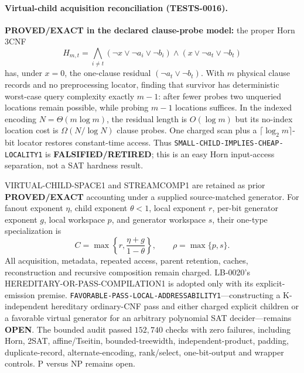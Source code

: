 \documentclass[11pt]{article}
\begin{document}
\paragraph{Virtual-child acquisition reconciliation (TESTS-0016).}
\textbf{PROVED/EXACT in the declared clause-probe model:} the proper Horn
3CNF
\[
 H_{m,t}=\bigwedge_{i\ne t}(\neg x\vee\neg a_i\vee\neg b_i)
 \wedge(x\vee\neg a_t\vee\neg b_t)
\]
has, under \(x=0\), the one-clause residual
\((\neg a_t\vee\neg b_t)\).  With \(m\) physical clause records and no
preprocessing locator, finding that survivor has deterministic worst-case
query complexity exactly \(m-1\): after fewer probes two unqueried locations
remain possible, while probing \(m-1\) locations suffices.  In the indexed
encoding \(N=\Theta(m\log m)\), the residual length is \(O(\log m)\) but its
no-index location cost is \(\Omega(N/\log N)\) clause probes.  One charged
scan plus a \(\lceil\log_2m\rceil\)-bit locator restores constant-time access.
Thus \texttt{SMALL-CHILD-IMPLIES-CHEAP-LOCALITY1} is
\textbf{FALSIFIED/RETIRED}; this is an easy Horn input-access separation, not
a SAT hardness result.

VIRTUAL-CHILD-SPACE1 and STREAMCOMP1 are retained as prior
\textbf{PROVED/EXACT} accounting under a supplied source-matched generator.
For fanout exponent \(\eta\), child exponent \(\theta<1\), local exponent
\(r\), per-bit generator exponent \(g\), local workspace \(p\), and generator
workspace \(s\), their one-type specialization is
\[
 C=\max\left\{r,\frac{\eta+g}{1-\theta}\right\},\qquad
 \rho=\max\{p,s\}.
\]
All acquisition, metadata, repeated access, parent retention, caches,
reconstruction and recursive composition remain charged.  LB-0020's
HEREDITARY-OR-PASS-COMPILATION1 is adopted only with its explicit-emission
premise.  \texttt{FAVORABLE-PASS-LOCAL-ADDRESSABILITY1}---constructing a
K-independent hereditary ordinary-CNF pass and either charged explicit
children or a favorable virtual generator for an arbitrary polynomial SAT
decider---remains \textbf{OPEN}.  The bounded audit passed \(152{,}740\)
checks with zero failures, including Horn, 2SAT, affine/Tseitin,
bounded-treewidth, independent-product, padding, duplicate-record,
alternate-encoding, rank/select, one-bit-output and wrapper controls.
P versus NP remains open.
\end{document}
